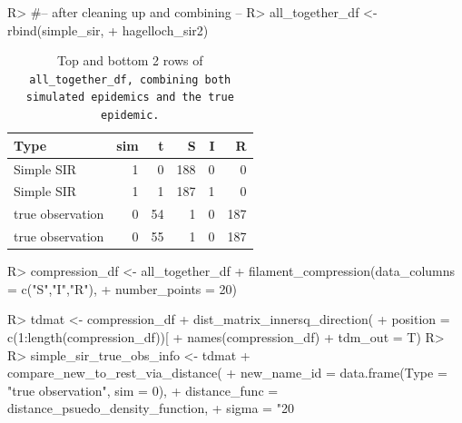 \documentclass[
  shortnames]{jss}
\begin{document}
\begin{CodeChunk}
\begin{CodeInput}
R> #-- after cleaning up and combining --
R> all_together_df <- rbind(simple_sir,
+                          hagelloch_sir2)
\end{CodeInput}
\end{CodeChunk}

\begin{CodeChunk}
\begin{table}[!h]

\caption{\label{tab:cif-all-together-df}Top and bottom 2 rows of \tt{all\_together\_df}\textnormal{, combining both simulated epidemics and the true epidemic.}}
\centering
\begin{tabular}[t]{lrrrrr}
\toprule
Type & sim & t & S & I & R\\
\midrule
Simple SIR & 1 & 0 & 188 & 0 & 0\\
Simple SIR & 1 & 1 & 187 & 1 & 0\\
true observation & 0 & 54 & 1 & 0 & 187\\
true observation & 0 & 55 & 1 & 0 & 187\\
\bottomrule
\end{tabular}
\end{table}

\end{CodeChunk}

\begin{CodeChunk}
\begin{CodeInput}
R> compression_df <- all_together_df %
+   filament_compression(data_columns = c("S","I","R"), 
+                        number_points = 20)
\end{CodeInput}
\end{CodeChunk}

\begin{CodeChunk}
\begin{CodeInput}
R> tdmat <- compression_df %
+   dist_matrix_innersq_direction(
+     position = c(1:length(compression_df))[
+       names(compression_df) %
+     tdm_out = T)
R> 
R> simple_sir_true_obs_info <- tdmat %
+   compare_new_to_rest_via_distance(
+     new_name_id = data.frame(Type = "true observation", sim = 0),
+     distance_func = distance_psuedo_density_function, 
+     sigma = "20%
\end{CodeInput}
\end{CodeChunk}
\end{document}
